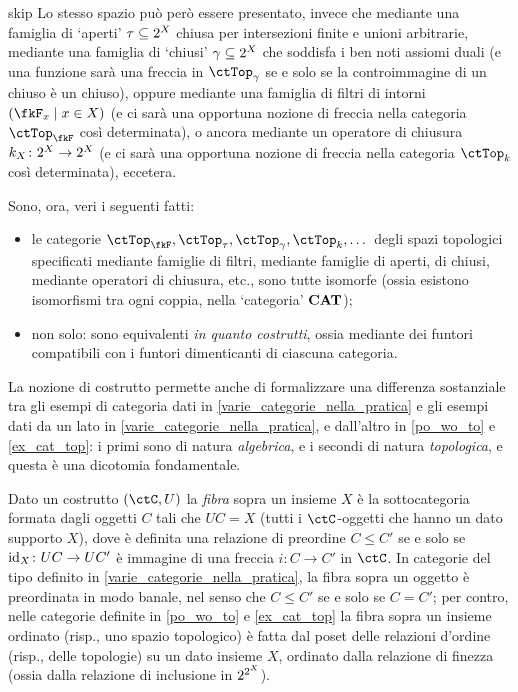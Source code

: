 \begin{hDigression}{skip}
 Lo stesso spazio può però essere presentato, invece che mediante una famiglia di `aperti' \(\tau \subseteq 2^{X}\) chiusa per intersezioni finite e unioni arbitrarie, mediante una famiglia di `chiusi' \(\gamma\subseteq 2^{X}\) che soddisfa i ben noti assiomi duali (e una funzione sarà una freccia in \(\ctTop_\gamma\) se e solo se la controimmagine di un chiuso è un chiuso), oppure mediante una famiglia di filtri di intorni \((\fkF_x \mid x\in X)\) (e ci sarà una opportuna nozione di freccia nella categoria \(\ctTop_\fkF\) così determinata), o ancora mediante un operatore di chiusura \(k_X \colon 2^{X}\to 2^{X}\) (e ci sarà una opportuna nozione di freccia nella categoria \(\ctTop_k\) così determinata), eccetera.

 Sono, ora, veri i seguenti fatti:
 \begin{itemize}
  \item le categorie \(\ctTop_\fkF,\ctTop_\tau,\ctTop_\gamma,\ctTop_k,\dots\) degli spazi topologici specificati mediante famiglie di filtri, mediante famiglie di aperti, di chiusi, mediante operatori di chiusura, etc., sono tutte isomorfe (ossia esistono isomorfismi tra ogni coppia, nella `categoria' \(\mathbf{CAT}\));
  \item non solo: sono equivalenti \emph{in quanto costrutti}, ossia mediante dei funtori compatibili con i funtori dimenticanti di ciascuna categoria.
 \end{itemize}
 La nozione di costrutto permette anche di formalizzare una differenza sostanziale tra gli esempi di categoria dati in \ref{varie_categorie_nella_pratica} e gli esempi dati da un lato in \ref{varie_categorie_nella_pratica}, e dall'altro in \ref{po_wo_to} e \ref{ex_cat_top}: i primi sono di natura \emph{algebrica}, e i secondi di natura \emph{topologica}, e questa è una dicotomia fondamentale.

 Dato un costrutto \((\ctC,U)\) la \emph{fibra} sopra un insieme \(X\) è la sottocategoria formata dagli oggetti \(C\) tali che \(UC=X\) (tutti i \(\ctC\)-oggetti che hanno un dato supporto \(X\)), dove è definita una relazione di preordine \(C\le C'\) se e solo se \(\mathrm{id}_X \colon UC \to UC'\) è immagine di una freccia \(i \colon C\to C'\) in \(\ctC\). In categorie del tipo definito in \ref{varie_categorie_nella_pratica}, la fibra sopra un oggetto è preordinata in modo banale, nel senso che \(C\le C'\) se e solo se \(C=C'\); per contro, nelle categorie definite in \ref{po_wo_to} e \ref{ex_cat_top} la fibra sopra un insieme ordinato (risp., uno spazio topologico) è fatta dal poset delle relazioni d'ordine (risp., delle topologie) su un dato insieme \(X\), ordinato dalla relazione di finezza (ossia dalla relazione di inclusione in \(2^{2^{X}}\)).
\end{hDigression}
